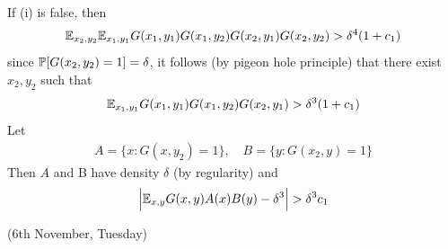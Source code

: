 \documentclass[12pt,a4paper]{report}
\newenvironment{proof}
{\begin{changemargin}{1cm}{0.5cm}
	}%
	{\end{changemargin}
}
\begin{document}
\begin{proof}
\begin{itemize}
\quad If (i) is false, then
\begin{align*}
\mathbb{E}_{x_2,y_2} \mathbb{E}_{x_1,y_1} G(x_1,y_1) G(x_1,y_2) G(x_2,y_1) G(x_2,y_2) > \delta^4 (1+c_1)
\end{align*}
since $\mathbb{P} [G(x_2,y_2)=1] = \delta$, it follows (by pigeon hole principle) that there exist $x_2, y_2$ such that
\begin{align*}
\mathbb{E}_{x_1,y_1} G(x_1, y_1) G(x_1,y_2) G(x_2, y_1) > \delta^3(1+c_1)
\end{align*}
Let
\begin{align*}
A = \{x: G(x,y_2) =1 \}, \quad B= \{ y: G(x_2,y) =1 \}
\end{align*}
Then $A$ and B have density $\delta$ (by regularity) and
\begin{align*}
\Big| \mathbb{E}_{x,y} G(x,y) A(x) B(y) -\delta^3 \Big| > \delta^3 c_1
\end{align*}
\end{itemize}
\end{proof}
\s

\newday

(6th November, Tuesday)
\s
\end{document}
